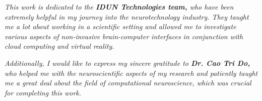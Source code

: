 \begin{dedication}

    \textit{This work is dedicated to the \textbf{IDUN Technologies team,} who have been extremely helpful in my journey into the neurotechnology industry. They taught me a lot about working in a scientific setting and allowed me to investigate various aspects of non-invasive brain-computer interfaces in conjunction with cloud computing and virtual reality.}

    \hfill \break

    \textit{Additionally, I would like to express my sincere gratitude to \textbf{Dr. Cao Tri Do,} who helped me with the neuroscientific aspects of my research and patiently taught me a great deal about the field of computational neuroscience, which was crucial for completing this work.}

\end{dedication}
